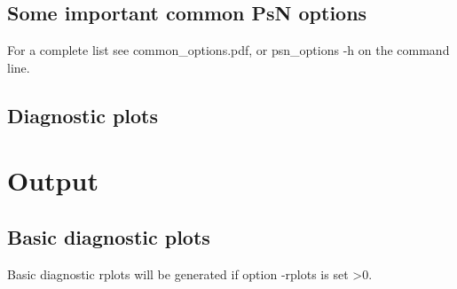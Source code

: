 \subsection{Some important common PsN options}
For a complete list see common\_options.pdf, or psn\_options -h on the command line.


\subsection{Diagnostic plots}
\newcommand{\rplotsconditions}{
See section Output, subsections Basic and Extended diagnostic plots, for descriptions of the default simeval plots. The default simeval template requires that libraries gridExtra and PerformanceAnalytics are installed. If the conditions are not fulfilled then no pdf will be generated, see the .Rout file in the main run directory for error messages.}


\section{Output}
\subsection{Basic diagnostic plots}
Basic diagnostic rplots will be generated if option -rplots is set >0.

